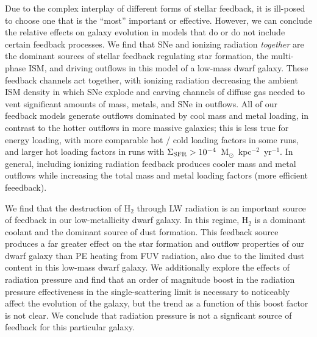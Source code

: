 \documentclass[twocolumn]{aastex62}
\begin{document}
Due to the complex interplay of different forms of stellar feedback, it is ill-posed to choose one that is the ``most'' important or effective. However, we can conclude the relative effects on galaxy evolution in models that do or do not include certain feedback processes. We find that SNe and ionizing radiation \textit{together} are the dominant sources of stellar feedback regulating star formation, the multi-phase ISM, and driving outflows in this model of a low-mass dwarf galaxy. These feedback channels act together, with ionizing radiation decreasing the ambient ISM density in which SNe explode and carving channels of diffuse gas needed to vent significant amounts of mass, metals, and SNe in outflows. All of our feedback models generate outflows dominated by cool mass and metal loading, in contrast to the hotter outflows in more massive galaxies; this is less true for energy loading, with more comparable hot / cold loading factors in some runs, and larger hot loading factors in runs with $\Sigma_{\rm SFR} > 10^{-4}$~M$_{\odot}$~kpc$^{-2}$~yr$^{-1}$. In general, including ionizing radiation feedback produces cooler mass and metal outflows while increasing the total mass and metal loading factors (more efficient feeedback). 

We find that the destruction of H$_2$ through LW radiation is an important source of feedback in our low-metallicity dwarf galaxy. In this regime, H$_2$ is a dominant coolant and the dominant source of dust formation. This feedback source produces a far greater effect on the star formation and outflow properties of our dwarf galaxy than PE heating from FUV radiation, also due to the limited dust content in this low-mass dwarf galaxy. We additionally explore the effects of radiation pressure and find that an order of magnitude boost in the radiation pressure effectiveness in the single-scattering limit is necessary to noticeably affect the evolution of the galaxy, but the trend as a function of this boost factor is not clear. We conclude that radiation pressure is not a signficant source of feedback for this particular galaxy.
\end{document}
